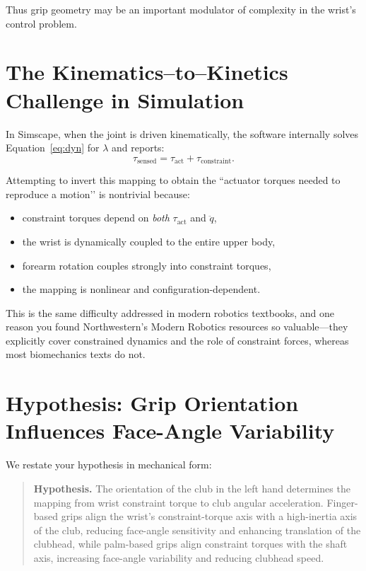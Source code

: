 \documentclass[11pt]{article}
\begin{document}
Thus grip geometry may be an important modulator of complexity in the wrist’s control problem.

\section{The Kinematics–to–Kinetics Challenge in Simulation}

In Simscape, when the joint is driven kinematically, the software internally solves 
Equation~\eqref{eq:dyn} for $\lambda$ and reports:
\[
\tau_{\text{sensed}} = \tau_{\text{act}} + \tau_{\text{constraint}}.
\]

Attempting to invert this mapping to obtain the ``actuator torques needed to reproduce a motion’’ 
is nontrivial because:
\begin{itemize}
    \item constraint torques depend on \emph{both} $\tau_{\text{act}}$ and $\ddot{q}$,
    \item the wrist is dynamically coupled to the entire upper body,
    \item forearm rotation couples strongly into constraint torques,
    \item the mapping is nonlinear and configuration-dependent.
\end{itemize}

This is the same difficulty addressed in modern robotics textbooks, and one reason 
you found Northwestern’s Modern Robotics resources so valuable—they explicitly cover constrained dynamics 
and the role of constraint forces, whereas most biomechanics texts do not.

\section{Hypothesis: Grip Orientation Influences Face-Angle Variability}

We restate your hypothesis in mechanical form:

\begin{quote}
\textbf{Hypothesis.}  
The orientation of the club in the left hand determines the mapping from wrist constraint torque 
to club angular acceleration.  
Finger-based grips align the wrist’s constraint-torque axis with a high-inertia axis of the club, 
reducing face-angle sensitivity and enhancing translation of the clubhead, while palm-based grips align 
constraint torques with the shaft axis, increasing face-angle variability and reducing clubhead speed.
\end{quote}
\end{document}
